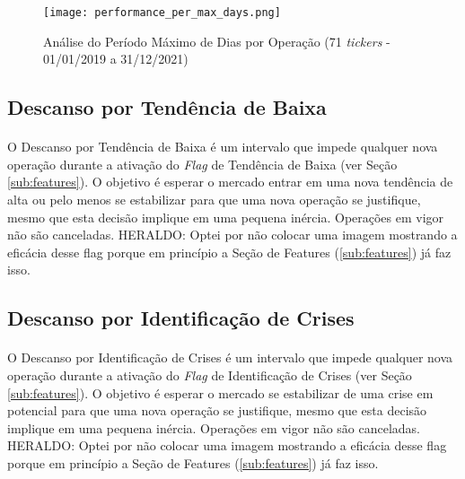 \begin{figure}[!htb]
    \texttt{[image: performance\_per\_max\_days.png]}
    \centering
    \caption{Análise do Período Máximo de Dias por Operação (71 \textit{tickers} - 01/01/2019 a 31/12/2021)}
    \label{fig:740}
\end{figure}




\FloatBarrier
\subsection{Descanso por Tendência de Baixa}
\label{sub:downtrend_halt}

\paragraph{} O Descanso por Tendência de Baixa é um intervalo que impede qualquer nova operação durante a ativação do \textit{Flag} de Tendência de Baixa (ver Seção \ref{sub:features}). O objetivo é esperar o mercado entrar em uma nova tendência de alta ou pelo menos se estabilizar para que uma nova operação se justifique, mesmo que esta decisão implique em uma pequena inércia. Operações em vigor não são canceladas. \color{red} HERALDO: Optei por não colocar uma imagem mostrando a eficácia desse flag porque em princípio a Seção de Features (\ref{sub:features}) já faz isso. 



\FloatBarrier
\subsection{Descanso por Identificação de Crises}
\label{sub:crisis_halt}

\paragraph{} O Descanso por Identificação de Crises é um intervalo que impede qualquer nova operação durante a ativação do \textit{Flag} de Identificação de Crises (ver Seção \ref{sub:features}). O objetivo é esperar o mercado se estabilizar de uma crise em potencial para que uma nova operação se justifique, mesmo que esta decisão implique em uma pequena inércia. Operações em vigor não são canceladas. \color{red} HERALDO: Optei por não colocar uma imagem mostrando a eficácia desse flag porque em princípio a Seção de Features (\ref{sub:features}) já faz isso. 



